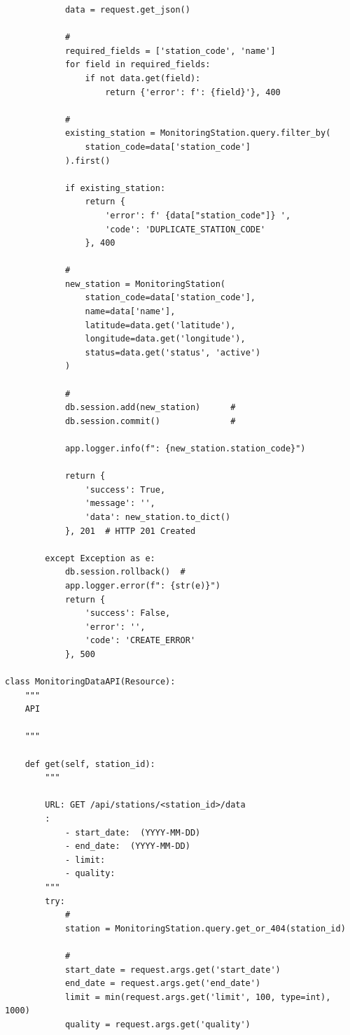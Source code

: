 \begin{verbatim}
            data = request.get_json()
            
            # 
            required_fields = ['station_code', 'name']
            for field in required_fields:
                if not data.get(field):
                    return {'error': f': {field}'}, 400
            
            # 
            existing_station = MonitoringStation.query.filter_by(
                station_code=data['station_code']
            ).first()
            
            if existing_station:
                return {
                    'error': f' {data["station_code"]} ',
                    'code': 'DUPLICATE_STATION_CODE'
                }, 400
            
            # 
            new_station = MonitoringStation(
                station_code=data['station_code'],
                name=data['name'],
                latitude=data.get('latitude'),
                longitude=data.get('longitude'),
                status=data.get('status', 'active')
            )
            
            # 
            db.session.add(new_station)      # 
            db.session.commit()              # 
            
            app.logger.info(f": {new_station.station_code}")
            
            return {
                'success': True,
                'message': '',
                'data': new_station.to_dict()
            }, 201  # HTTP 201 Created
            
        except Exception as e:
            db.session.rollback()  # 
            app.logger.error(f": {str(e)}")
            return {
                'success': False,
                'error': '',
                'code': 'CREATE_ERROR'
            }, 500

class MonitoringDataAPI(Resource):
    """
    API
    
    """
    
    def get(self, station_id):
        """

        URL: GET /api/stations/<station_id>/data
        :
            - start_date:  (YYYY-MM-DD)
            - end_date:  (YYYY-MM-DD)
            - limit: 
            - quality: 
        """
        try:
            # 
            station = MonitoringStation.query.get_or_404(station_id)
            
            # 
            start_date = request.args.get('start_date')
            end_date = request.args.get('end_date')
            limit = min(request.args.get('limit', 100, type=int), 1000)
            quality = request.args.get('quality')
            

\end{verbatim}
